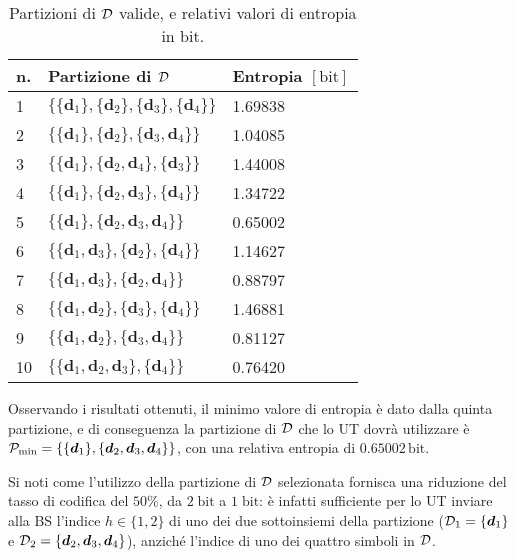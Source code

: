 \begin{table}[ht]
    \centering
    \renewcommand{\arraystretch}{1.4}
    \begin{tabular}{lll}
        \toprule
        n. & Partizione di \(\mathcal{D}\) & Entropia \([\mathrm{bit}]\)\\
        \midrule
        1 & \(\{ \{\bm{d}_1\}, \{\bm{d}_2\}, \{\bm{d}_3\}, \{\bm{d}_4\} \}\) & 1.69838 \\
        2 & \(\{ \{\bm{d}_1\}, \{\bm{d}_2\}, \{\bm{d}_3, \bm{d}_4\} \}\) & 1.04085 \\
        3 & \(\{ \{\bm{d}_1\}, \{\bm{d}_2, \bm{d}_4\}, \{\bm{d}_3\} \}\) & 1.44008 \\
        4 & \(\{ \{\bm{d}_1\}, \{\bm{d}_2, \bm{d}_3\}, \{\bm{d}_4\} \}\) & 1.34722 \\
        5 & \(\{ \{\bm{d}_1\}, \{\bm{d}_2, \bm{d}_3, \bm{d}_4\} \}\) & 0.65002 \\
        6 & \(\{ \{\bm{d}_1, \bm{d}_3\}, \{\bm{d}_2\}, \{\bm{d}_4\} \}\) & 1.14627 \\
        7 & \(\{ \{\bm{d}_1, \bm{d}_3\}, \{\bm{d}_2, \bm{d}_4\} \}\) & 0.88797 \\
        8 & \(\{ \{\bm{d}_1, \bm{d}_2\}, \{\bm{d}_3\}, \{\bm{d}_4\} \}\) & 1.46881 \\
        9 & \(\{ \{\bm{d}_1, \bm{d}_2\}, \{\bm{d}_3, \bm{d}_4\} \}\) & 0.81127 \\
        10 & \(\{ \{\bm{d}_1, \bm{d}_2, \bm{d}_3\}, \{\bm{d}_4\} \}\) & 0.76420 \\
        \bottomrule
    \end{tabular}
    \caption{Partizioni di $\mathcal{D}$ valide, e relativi valori di entropia in
    $\mathrm{bit}$.}
    \label{tab:apx-partitions-of-d}
\end{table}
\newline
Osservando i risultati ottenuti, il minimo valore di entropia è dato dalla
quinta partizione, e di conseguenza la partizione di \(\mathcal{D}\) che lo UT
dovrà utilizzare è \(\mathcal{P}_\mathrm{min} = \{ \{\bm{d}_1\}, \{\bm{d}_2,
\bm{d}_3, \bm{d}_4\} \}\), con una relativa entropia di
$0.65002\,\mathrm{bit}$.

Si noti come l'utilizzo della partizione di \(\mathcal{D}\) selezionata fornisca
una riduzione del tasso di codifica del \(50\%\), da \(2\;\mathrm{bit}\) a
\(1\;\mathrm{bit}\): è infatti sufficiente per lo UT inviare alla BS l'indice
$h \in \{1,2\}$ di uno dei due sottoinsiemi della partizione ($\mathcal{D}_1 =
\{\bm{d}_1\}$ e $\mathcal{D}_2 = \{\bm{d}_2, \bm{d}_3, \bm{d}_4\}$), anziché
l'indice di uno dei quattro simboli in \(\mathcal{D}\).

